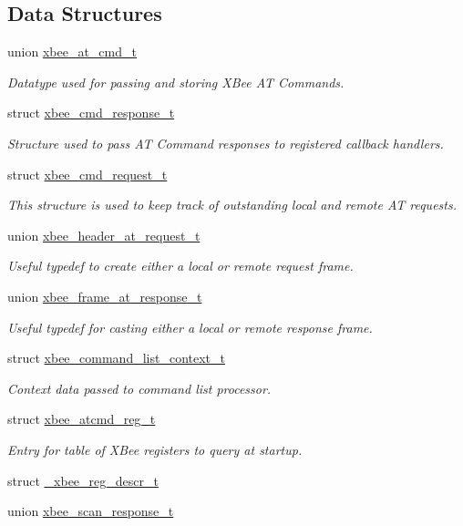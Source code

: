 \subsection*{Data Structures}
\begin{DoxyCompactItemize}
\item 
union \hyperlink{unionxbee__at__cmd__t}{xbee\+\_\+at\+\_\+cmd\+\_\+t}
\begin{DoxyCompactList}\small\item\em Datatype used for passing and storing X\+Bee AT Commands. \end{DoxyCompactList}\item 
struct \hyperlink{structxbee__cmd__response__t}{xbee\+\_\+cmd\+\_\+response\+\_\+t}
\begin{DoxyCompactList}\small\item\em Structure used to pass AT Command responses to registered callback handlers. \end{DoxyCompactList}\item 
struct \hyperlink{structxbee__cmd__request__t}{xbee\+\_\+cmd\+\_\+request\+\_\+t}
\begin{DoxyCompactList}\small\item\em This structure is used to keep track of outstanding local and remote AT requests. \end{DoxyCompactList}\item 
union \hyperlink{unionxbee__header__at__request__t}{xbee\+\_\+header\+\_\+at\+\_\+request\+\_\+t}
\begin{DoxyCompactList}\small\item\em Useful typedef to create either a local or remote request frame. \end{DoxyCompactList}\item 
union \hyperlink{unionxbee__frame__at__response__t}{xbee\+\_\+frame\+\_\+at\+\_\+response\+\_\+t}
\begin{DoxyCompactList}\small\item\em Useful typedef for casting either a local or remote response frame. \end{DoxyCompactList}\item 
struct \hyperlink{structxbee__command__list__context__t}{xbee\+\_\+command\+\_\+list\+\_\+context\+\_\+t}
\begin{DoxyCompactList}\small\item\em Context data passed to command list processor. \end{DoxyCompactList}\item 
struct \hyperlink{structxbee__atcmd__reg__t}{xbee\+\_\+atcmd\+\_\+reg\+\_\+t}
\begin{DoxyCompactList}\small\item\em Entry for table of X\+Bee registers to query at startup. \end{DoxyCompactList}\item 
struct \hyperlink{struct__xbee__reg__descr__t}{\+\_\+xbee\+\_\+reg\+\_\+descr\+\_\+t}
\item 
union \hyperlink{unionxbee__scan__response__t}{xbee\+\_\+scan\+\_\+response\+\_\+t}
\end{DoxyCompactItemize}
